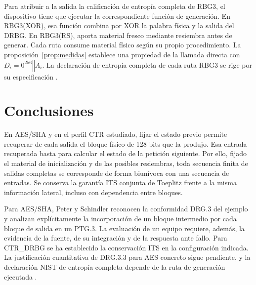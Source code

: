 \documentclass[11pt,a4paper]{article}
\newcommand{\cat}{\mathbin\Vert}
\begin{document}
Para atribuir a la salida la calificación de entropía completa de RBG3, el dispositivo tiene que ejecutar la correspondiente función de generación. En RBG3(XOR), esa función combina por XOR la palabra física y la salida del DRBG. En RBG3(RS), aporta material fresco mediante resiembra antes de generar. Cada ruta consume material físico según su propio procedimiento. La proposición~\ref{prop:medidas} establece una propiedad de la llamada directa con \(D_i=0^{256}\cat A_i\). La declaración de entropía completa de cada ruta RBG3 se rige por su especificación \cite[secs.~6.4 y 6.5]{nist90c}.

\section{Conclusiones}
En AES/SHA y en el perfil CTR estudiado, fijar el estado previo permite recuperar de cada salida el bloque físico de 128 bits que la produjo. Esa entrada recuperada basta para calcular el estado de la petición siguiente. Por ello, fijado el material de inicialización y de las posibles resiembras, toda secuencia finita de salidas completas se corresponde de forma biunívoca con una secuencia de entradas. Se conserva la garantía ITS conjunta de Toeplitz frente a la misma información lateral, incluso con dependencia entre bloques.

Para AES/SHA, Peter y Schindler reconocen la conformidad DRG.3 del ejemplo y analizan explícitamente la incorporación de un bloque intermedio por cada bloque de salida en un PTG.3. La evaluación de un equipo requiere, además, la evidencia de la fuente, de su integración y de la respuesta ante fallo. Para CTR\_DRBG se ha establecido la conservación ITS en la configuración indicada. La justificación cuantitativa de DRG.3.3 para AES concreto sigue pendiente, y la declaración NIST de entropía completa depende de la ruta de generación ejecutada \cite[párrs.~375, 390(iii), 996--998 y 1007]{ais}\cite[secs.~6.3--6.5]{nist90c}.

\appendix
\end{document}
